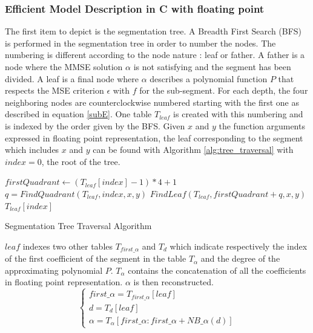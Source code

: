 \documentclass[fleqn,10pt]{SelfArx} %
\begin{document}
\subsubsection{Efficient Model Description in C with floating point}
The first item to depict is the segmentation tree.
A Breadth First Search (BFS) is performed in the segmentation tree in order to number the nodes. The numbering is different according to the node nature : leaf or father. A father is a node where the MMSE solution $\alpha$ is not satisfying and the segment has been divided. A leaf is a final node where $\alpha$ describes a polynomial function $P$ that respects the MSE criterion $\epsilon$ with $f$ for the sub-segment.
For each depth, the four neighboring nodes are counterclockwise numbered starting with the first one as described in equation \ref{subE}.
One table $T_{leaf}$ is created with this numbering and is indexed by the order given by the BFS.
Given $x$ and $y$ the function arguments expressed in floating point representation, the leaf corresponding to the segment which includes $x$ and $y$ can be found with Algorithm \ref{alg:tree_traversal} with $index = 0$, the root of the tree.
\begin{algorithm}
\begin{algorithmic}[1]
	\State $firstQuadrant \gets (T_{leaf}[index] -1)*4+1$
	\State $q = FindQuadrant(T_{leaf}, index, x, y)$
	\State \Return $FindLeaf(T_{leaf}, firstQuadrant+q, x, y)$
\Else
	\State \Return $T_{leaf}[index]$
\EndIf
\EndFunction
\end{algorithmic}
\caption{Segmentation Tree Traversal Algorithm}
\label{alg:tree_traversal}
\end{algorithm}

$leaf$ indexes two other tables $T_{first\_\alpha}$ and $T_d$ which indicate respectively the index of the first coefficient of the segment in the table $T_{\alpha}$ and the degree of the approximating polynomial $P$. $T_{\alpha}$ contains the concatenation of all the coefficients in floating point representation. $\alpha$ is then reconstructed.
\begin{equation*}
\begin{cases}
first\_\alpha = T_{first\_\alpha}[leaf]\\
d = T_d[leaf] \\
\alpha = T_{\alpha}[first\_\alpha:first\_\alpha+NB\_\alpha(d)]
\end{cases}
\end{equation*}
\end{document}

